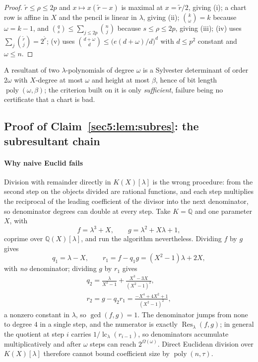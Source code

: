 \documentclass[journal]{IEEEtran}
\theoremstyle{plainn}
\theoremstyle{remark}
\newcommand{\poly}{\operatorname{poly}}
\begin{document}
\begin{proof}
$\widetilde r\le\rho\le2p$ and $x\mapsto x(\widetilde r-x)$ is maximal at $x=\widetilde r/2$, giving
(i); a chart row is affine in $X$ and the pencil is linear in $\lambda$, giving (ii);
$\binom k\omega=k$ because $\omega=k-1$, and $\binom qs\le\sum_{j\le2p}\binom nj$ because
$s\le\rho\le2p$, giving (iii); (iv) uses $\sum_j\binom{\widetilde r}j=2^{\widetilde r}$; (v) uses
$\binom{d+\omega}d\le\bigl(e(d+\omega)/d\bigr)^{d}$ with $d\le p^{2}$ constant and $\omega\le n$.
\end{proof}

A resultant of two $\lambda$-polynomials of degree $\omega$ is a Sylvester determinant of order
$2\omega$ with $X$-degree at most $\omega$ and height at most $\beta$, hence of bit length
$\poly(\omega,\beta)$; the criterion built on it is only \emph{sufficient}, failure being no certificate
that a chart is bad.


\subsection{Proof of Claim~\ref{sec5:lem:subres}: the subresultant chain}\label{appBC:sub:subres}


\paragraph{Why naive Euclid fails}\label{appBC:sub:naive}
Division with remainder directly in $K(X)[\lambda]$ is the wrong procedure: from the second step on the
objects divided are rational functions, and each step multiplies the reciprocal of the leading
coefficient of the divisor into the next denominator, so denominator degrees can double at every step.
Take $K=\mathbb{Q}$ and one parameter $X$, with
\[
f=\lambda^{3}+X,\qquad g=\lambda^{2}+X\lambda+1 ,
\]
coprime over $\mathbb{Q}(X)[\lambda]$, and run the algorithm nevertheless. Dividing $f$ by $g$ gives
\[
q_1=\lambda-X,\qquad r_1=f-q_1g=(X^{2}-1)\lambda+2X ,
\]
with \emph{no} denominator; dividing $g$ by $r_1$ gives
\[
\begin{gathered}
q_2=\frac{\lambda}{X^{2}-1}+\frac{X^{3}-3X}{(X^{2}-1)^{2}},\\
r_2=g-q_2r_1=\frac{-X^{4}+4X^{2}+1}{(X^{2}-1)^{2}} ,
\end{gathered}
\]
a nonzero constant in $\lambda$, so $\gcd(f,g)=1$. The denominator jumps from none to degree $4$ in a
single step, and the numerator is exactly $\operatorname{Res}_\lambda(f,g)$; in general the quotient at
step $i$ carries $1/\operatorname{lc}_\lambda(r_{i-1})$, so denominators accumulate multiplicatively and
after $\omega$ steps can reach $2^{\Omega(\omega)}$. Direct Euclidean division over $K(X)[\lambda]$
therefore cannot bound coefficient size by $\poly(n,\tau)$.
\end{document}
